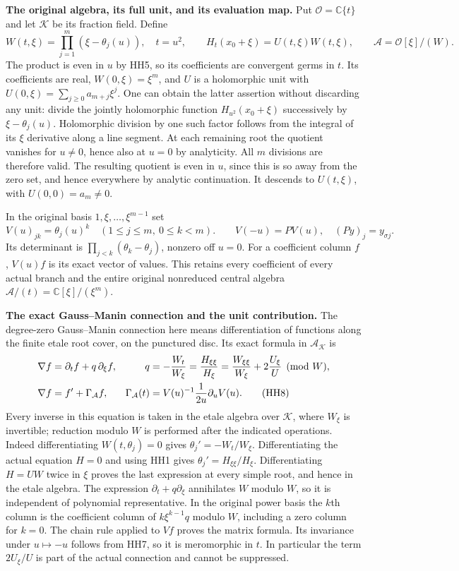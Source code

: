\HH\textbf{The original algebra, its full unit, and its evaluation map.}
Put $\mathcal O=\mathbb C\{t\}$ and let $\mathcal K$ be its fraction field.
Define
\[
 W(t,\xi)=\prod_{j=1}^m(\xi-\theta_j(u)),\quad t=u^2,\qquad
 H_t(x_0+\xi)=U(t,\xi)W(t,\xi),\qquad
 \mathcal A=\mathcal O[\xi]/(W).
 \tag{HH6}\label{hh:original-algebra}
\]
The product is even in $u$ by HH5, so its coefficients are
convergent germs in $t$. Its coefficients are real, $W(0,\xi)=\xi^m$,
and $U$ is a holomorphic unit with
$U(0,\xi)=\sum_{j\ge0}a_{m+j}\xi^j$.
One can obtain the latter assertion without discarding any unit:
divide the jointly holomorphic function $H_{u^2}(x_0+\xi)$ successively
by $\xi-\theta_j(u)$. Holomorphic division by one such factor follows
from the integral of its $\xi$ derivative along a line segment.
At each remaining root the quotient vanishes for $u\ne0$, hence
also at $u=0$ by analyticity. All $m$ divisions are therefore valid.
The resulting quotient is even in $u$, since this is so away from
the zero set, and hence everywhere by analytic continuation.
It descends to $U(t,\xi)$, with $U(0,0)=a_m\ne0$.

In the original basis $1,\xi,\ldots,\xi^{m-1}$ set
\[
 V(u)_{jk}=\theta_j(u)^k\quad(1\le j\le m,\ 0\le k<m).
 \qquad V(-u)=P V(u),\quad
 (Py)_j=y_{\sigma j}.
 \tag{HH7}\label{hh:vandermonde}
\]
Its determinant is $\prod_{j<k}(\theta_k-\theta_j)$, nonzero off $u=0$.
For a coefficient column $f$, $V(u)f$ is its exact vector of values.
This retains every coefficient of every actual branch and the entire
original nonreduced central algebra
$\mathcal A/(t)=\mathbb C[\xi]/(\xi^m)$.

\HH\textbf{The exact Gauss--Manin connection and the unit contribution.}
The degree-zero Gauss--Manin connection here means differentiation
of functions along the finite etale root cover, on the punctured
disc. Its exact formula in $\mathcal A_{\mathcal K}$ is
\begin{align}
 \nabla f&=\partial_tf+q\,\partial_\xi f,&
 q&=-\frac{W_t}{W_\xi}
   =\frac{H_{\xi\xi}}{H_\xi}
   =\frac{W_{\xi\xi}}{W_\xi}+2\frac{U_\xi}{U}\pmod W, \notag\\
 \nabla f&=f'+\Gamma_{\mathcal A}f,&
 \Gamma_{\mathcal A}(t)&=
     V(u)^{-1}\frac1{2u}\partial_u V(u).
 \tag{HH8}\label{hh:connection}
\end{align}
Every inverse in this equation is taken in the etale algebra over
$\mathcal K$, where $W_\xi$ is invertible; reduction modulo $W$ is
performed after the indicated operations.
Indeed differentiating $W(t,\theta_j)=0$ gives
$\theta_j'=-W_t/W_\xi$. Differentiating the actual equation $H=0$
and using HH1 gives $\theta_j'=H_{\xi\xi}/H_\xi$.
Differentiating $H=UW$ twice in $\xi$ proves the last expression
at every simple root, and hence in the etale algebra.
The expression $\partial_t+q\partial_\xi$ annihilates $W$ modulo $W$,
so it is independent of polynomial representative.
In the original power basis the $k$th column is the coefficient
column of $k\xi^{k-1}q$ modulo $W$, including a zero column for $k=0$.
The chain rule applied to $Vf$ proves the matrix formula.
Its invariance under $u\mapsto-u$ follows from HH7, so it is
meromorphic in $t$. In particular the term $2U_\xi/U$ is part of
the actual connection and cannot be suppressed.


